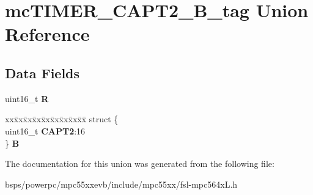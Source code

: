 \hypertarget{unionmcTIMER__CAPT2__16B__tag}{}\section{mc\+T\+I\+M\+E\+R\+\_\+\+C\+A\+P\+T2\+\_\+B\+\_\+tag Union Reference}
\label{unionmcTIMER__CAPT2__16B__tag}
\subsection*{Data Fields}
\begin{DoxyCompactItemize}
\item 
\mbox{\label{unionmcTIMER__CAPT2__16B__tag_ae17a103e081313ff7d23aa0e53a8b934}} 
uint16\+\_\+t {\bfseries R}
\item 
\mbox{\label{unionmcTIMER__CAPT2__16B__tag_a3e58f64968760bd0116cb0cbf03e29d0}} 
\begin{tabbing}
xx\=xx\=xx\=xx\=xx\=xx\=xx\=xx\=xx\=\kill
struct \{\\
\>uint16\_t {\bfseries CAPT2}:16\\
\} {\bfseries B}\\

\end{tabbing}\end{DoxyCompactItemize}


The documentation for this union was generated from the following file\+:\begin{DoxyCompactItemize}
\item 
bsps/powerpc/mpc55xxevb/include/mpc55xx/fsl-\/mpc564x\+L.\+h\end{DoxyCompactItemize}
